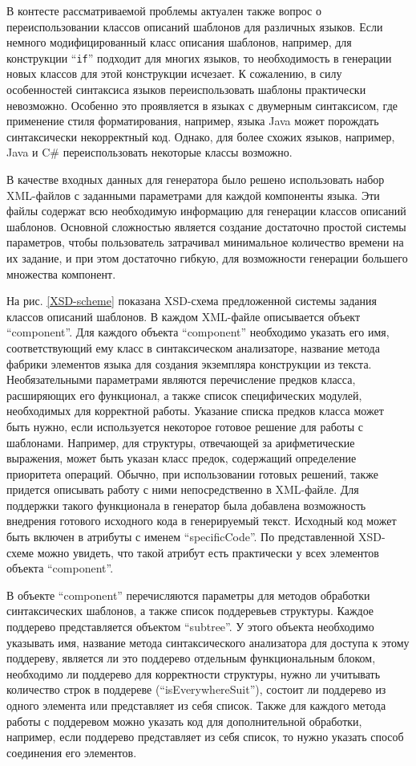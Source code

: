 \documentclass{matmex-diploma}
\begin{document}
В контесте рассматриваемой проблемы актуален также вопрос о переиспользовании классов описаний шаблонов для различных языков. Если немного модифицированный класс описания шаблонов, например, для конструкции “\lstinline{if}” подходит для многих языков, то необходимость в генерации новых классов для этой конструкции исчезает. К сожалению, в силу особенностей синтаксиса языков переиспользовать шаблоны практически невозможно. Особенно это проявляется в языках с двумерным синтаксисом, где применение стиля форматирования, например, языка Java может порождать синтаксически некорректный код. Однако, для более схожих языков, например, Java и C\# переиспользовать некоторые классы возможно.

В качестве входных данных для генератора было решено использовать набор XML-файлов с заданными параметрами для каждой компоненты языка. Эти файлы содержат всю необходимую информацию для генерации классов описаний шаблонов. Основной сложностью является создание достаточно простой системы параметров, чтобы пользователь затрачивал минимальное количество времени на их задание, и при этом достаточно гибкую, для возможности генерации большего множества компонент.

На рис. \ref{XSD-scheme} показана XSD-схема предложенной системы задания классов описаний шаблонов. В каждом XML-файле описывается объект “component”. Для каждого объекта “component” необходимо указать его имя, соответствующий ему класс в синтаксическом анализаторе, название метода фабрики элементов языка для создания экземпляра конструкции из текста. Необязательными параметрами являются перечисление предков класса, расширяющих его функционал, а также список специфических модулей, необходимых для корректной работы. Указание списка предков класса может быть нужно, если используется некоторое готовое решение для работы с шаблонами. Например, для структуры, отвечающей за арифметические выражения, может быть указан класс предок, содержащий определение приоритета операций. Обычно, при использовании готовых решений, также придется описывать работу с ними непосредственно в XML-файле. Для поддержки такого функционала в генератор была добавлена возможность внедрения готового исходного кода в генерируемый текст. Исходный код может быть включен в атрибуты с именем “specificCode”. По представленной XSD-схеме можно увидеть, что такой атрибут есть практически у всех элементов объекта “component”.

В объекте “component” перечисляются параметры для методов обработки синтаксических шаблонов, а также список поддеревьев структуры. Каждое поддерево представляется объектом “subtree”. У этого объекта необходимо указывать имя, название метода синтаксического анализатора для доступа к этому поддереву, является ли это поддерево отдельным функциональным блоком, необходимо ли поддерево для корректности структуры, нужно ли учитывать количество строк в поддереве (“isEverywhereSuit”), состоит ли поддерево из одного элемента или представляет из себя список. Также для каждого метода работы с поддеревом можно указать код для дополнительной обработки, например, если поддерево представляет из себя список, то нужно указать способ соединения его элементов.
\end{document}
